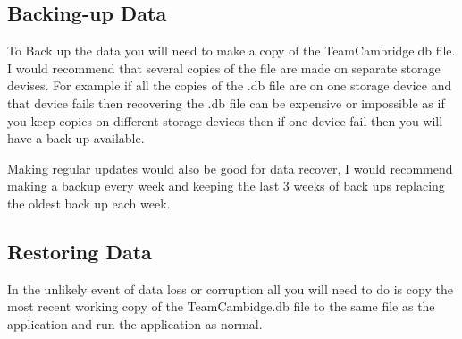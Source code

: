 \subsection{Backing-up Data}
To Back up the data you will need to make a copy of the TeamCambridge.db file. I would recommend that several copies of the file are made on separate storage devises. For example if all the copies of the .db file are on one storage device and that device fails then recovering the .db file can be expensive or impossible as if you keep copies on different storage devices then if one device fail then you will have a back up available.

Making regular updates would also be good for data recover, I would recommend making a backup every week and keeping the last 3 weeks of back ups replacing the oldest back up each week. 
\subsection{Restoring Data}
In the unlikely event of data loss or corruption all you will need to do is copy the most recent working copy of the TeamCambidge.db file to the same file as the application and run the application as normal.